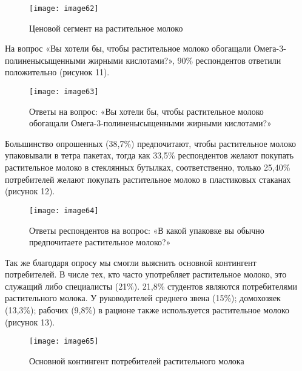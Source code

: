 \begin{figure}[H]
\centering
\texttt{[image: image62]}
\caption{Ценовой сегмент на растительное молоко}
\end{figure}

На вопрос «Вы хотели бы, чтобы растительное молоко обогащали
Омега-3-полиненысыщенными жирными кислотами?», 90\% респондентов
ответили положительно (рисунок 11).

\begin{figure}[H]
\centering
\texttt{[image: image63]}
\caption{Ответы на вопрос: «Вы хотели бы, чтобы растительное молоко
обогащали Омега-3-полиненысыщенными жирными кислотами?»}
\end{figure}

Большинство опрошенных (38,7\%) предпочитают, чтобы растительное молоко
упаковывали в тетра пакетах, тогда как 33,5\% респондентов желают
покупать растительное молоко в стеклянных бутылках, соответственно,
только 25,40\% потребителей желают покупать растительное молоко в
пластиковых стаканах (рисунок 12).

\begin{figure}[H]
\centering
\texttt{[image: image64]}
\caption{Ответы респондентов на вопрос: «В какой упаковке вы обычно предпочитаете растительное молоко?»}
\end{figure}

Так же благодаря опросу мы смогли выяснить основной контингент
потребителей. В числе тех, кто часто употребляет растительное молоко,
это служащий либо специалисты (21\%). 21,8\% студентов являются
потребителями растительного молока. У руководителей среднего звена
(15\%); домохозяек (13,3\%); рабочих (9,8\%) в рационе также
используется растительное молоко (рисунок 13).

\begin{figure}[H]
\centering
\texttt{[image: image65]}
\caption{Основной контингент потребителей растительного молока}
\end{figure}

